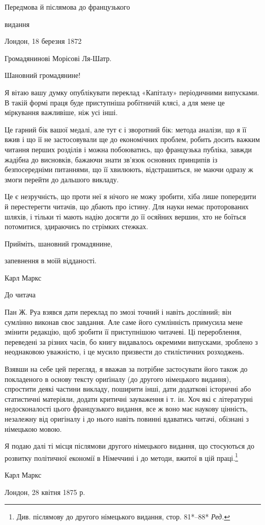 Передмова й післямова до французького

видання

Лондон, 18 березня 1872

Громадянинові Морісові Ля-Шатр.

Шановний громадянине!

Я вітаю вашу думку опублікувати переклад «Капіталу» періодичними
випусками. В такій формі праця буде приступніша
робітничій клясі, а для мене це міркування важливіше, ніж
усі інші.

Це гарний бік вашої медалі, але тут є і зворотний бік: метода
аналізи, що я її вжив і що її не застосовували ще до економічних
проблем, робить досить важким читання перших розділів і можна
побоюватись, що французька публіка, завжди жадібна до висновків,
бажаючи знати зв’язок основних принципів із безпосередніми
питаннями, що її хвилюють, відстрашиться, не маючи одразу ж
змоги перейти до дальшого викладу.

Це є незручність, що проти неї я нічого не можу зробити, хіба
лише попередити й перестерегти читачів, що дбають про істину.
Для науки немає проторованих шляхів, і тільки ті мають надію
досягти до її осяйних вершин, хто не боїться потомитися, здираючись
по стрімких стежках.

Прийміть, шановний громадянине,

запевнення в моїй відданості.

Карл Маркс

До читача

Пан Ж. Руа взявся дати переклад по змозі точний і навіть
дослівний; він сумлінно виконав своє завдання. Але саме його
сумлінність примусила мене змінити редакцію, щоб зробити її
приступнішою читачеві. Ці перероблення, переведені за різних
часів, бо книгу видавалось окремими випусками, зроблено з
неоднаковою уважністю, і це мусило призвести до стилістичних
розходжень.

Взявши на себе цей перегляд, я вважав за потрібне застосувати
його також до покладеного в основу тексту ориґіналу (до другого
німецького видання), спростити деякі частини викладу, поширити
інші, дати додаткові історичні або статистичні матеріяли, додати
критичні зауваження і т. ін. Хоч які є літературні недосконалості
цього французького видання, все ж воно має наукову цінність,
незалежну від оригіналу і до нього навіть повинні вдаватись
читачі, обізнані з німецькою мовою.

Я подаю далі ті місця післямови другого німецького видання,
що стосуються до розвитку політичної економії в Німеччині і до
методи, вжитої в цій праці.\footnote*{
Див. післямову до другого німецького видання, стор. 81*--88* \emph{Ред.}
}

Карл Маркс

Лондон, 28 квітня 1875 р.
